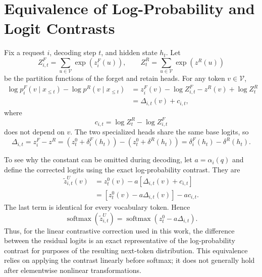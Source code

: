 \documentclass[11pt]{article}
\begin{document}



\appendix

\section{Equivalence of Log-Probability and Logit Contrasts}
\label{app:logit-contrast}

Fix a request $i$, decoding step $t$, and hidden state $h_t$. Let
\begin{equation}
    Z_{i,t}^F=\sum_{u\in\mathcal{V}}\exp\!\left(z_i^F(u)\right),
    \qquad
    Z_t^R=\sum_{u\in\mathcal{V}}\exp\!\left(z^R(u)\right)
\end{equation}
be the partition functions of the forget and retain heads. For any token $v\in\mathcal{V}$,
\begin{align}
    \log p_i^F(v\mid x_{\leq t})
    -\log p^R(v\mid x_{\leq t})
    &=z_i^F(v)-\log Z_{i,t}^F-z^R(v)+\log Z_t^R \\
    &=\Delta_{i,t}(v)+c_{i,t},
\end{align}
where
\begin{equation}
    c_{i,t}=\log Z_t^R-\log Z_{i,t}^F
\end{equation}
does not depend on $v$. The two specialized heads share the same base logits, so
\begin{equation}
    \Delta_{i,t}
    =z_i^F-z^R
    =\left(z_t^0+\delta_i^F(h_t)\right)
     -\left(z_t^0+\delta^R(h_t)\right)
    =\delta_i^F(h_t)-\delta^R(h_t).
\end{equation}

To see why the constant can be omitted during decoding, let $a=\alpha_i(q)$ and define the corrected logits using the exact log-probability contrast. They are
\begin{align}
    \widetilde z_{i,t}^U(v)
    &=z_t^0(v)-a
    \left[\Delta_{i,t}(v)+c_{i,t}\right] \\
    &=\left[z_t^0(v)-a\Delta_{i,t}(v)\right]
      -a c_{i,t}.
\end{align}
The last term is identical for every vocabulary token. Hence
\begin{equation}
    \operatorname{softmax}\!\left(\widetilde z_{i,t}^U\right)
    =\operatorname{softmax}\!\left(z_t^0-a\Delta_{i,t}\right).
\end{equation}
Thus, for the linear contrastive correction used in this work, the difference between the residual logits is an exact representative of the log-probability contrast for purposes of the resulting next-token distribution. This equivalence relies on applying the contrast linearly before softmax; it does not generally hold after elementwise nonlinear transformations.
\end{document}
